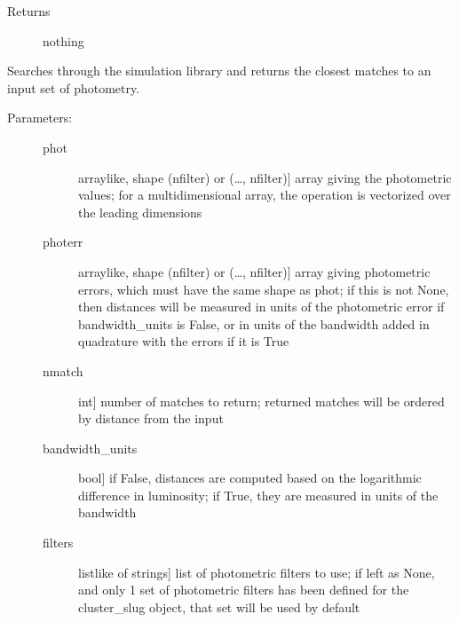 \documentclass[letterpaper,10pt,english]{sphinxmanual}
\begin{document}
\begin{fulllineitems}
\begin{fulllineitems}
\begin{description}
\item[{Returns}] \leavevmode
nothing

\end{description}

\end{fulllineitems}


\begin{fulllineitems}
\label{\detokenize{cluster_slug:slugpy.cluster_slug.cluster_slug.bestmatch}}
Searches through the simulation library and returns the closest
matches to an input set of photometry.
\begin{description}
\item[{Parameters:}] \leavevmode\begin{description}
\item[{phot}] \leavevmode{[}arraylike, shape (nfilter) or (…, nfilter){]}
array giving the photometric values; for a
multidimensional array, the operation is vectorized over
the leading dimensions

\item[{photerr}] \leavevmode{[}arraylike, shape (nfilter) or (…, nfilter){]}
array giving photometric errors, which must have the
same shape as phot; if this is not None,
then distances will be measured in units of the
photometric error if bandwidth\_units is False, or in
units of the bandwidth added in quadrature with the
errors if it is True

\item[{nmatch}] \leavevmode{[}int{]}
number of matches to return; returned matches will be
ordered by distance from the input

\item[{bandwidth\_units}] \leavevmode{[}bool{]}
if False, distances are computed based on the
logarithmic difference in luminosity; if True, they are
measured in units of the bandwidth

\item[{filters}] \leavevmode{[}listlike of strings{]}
list of photometric filters to use; if left as None, and
only 1 set of photometric filters has been defined for
the cluster\_slug object, that set will be used by
default

\end{description}


\end{description}
\end{fulllineitems}
\end{fulllineitems}
\end{document}
